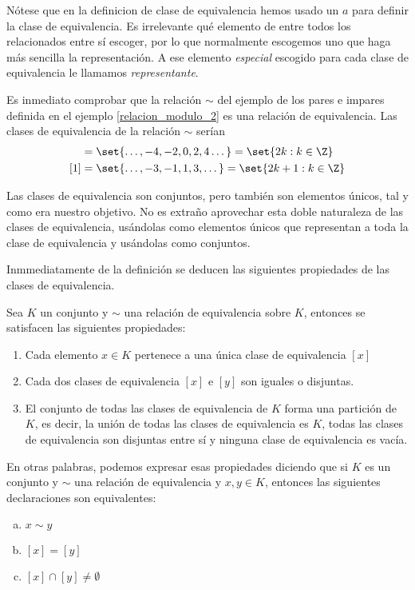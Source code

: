 \documentclass[../algebra_lineal.tex]{subfiles}
\begin{document}
\begin{remark}
    Nótese que en la definicion de clase de equivalencia hemos usado un $a$ para definir la clase de equivalencia. Es irrelevante qué elemento de entre todos los relacionados entre sí escoger, por lo que normalmente escogemos uno que haga más sencilla la representación. A ese elemento \textit{especial} escogido para cada clase de equivalencia le llamamos \textit{representante}.
\end{remark}

\begin{example}
    Es inmediato comprobar que la relación $\sim$ del ejemplo de los pares e impares definida en el ejemplo \ref{relacion_modulo_2} es una relación de equivalencia. Las clases de equivalencia de la relación $\sim$ serían
    \begin{align*}
        [0] &= \set{\dots, -4, -2, 0, 2, 4 \dots} = \set{2k : k \in \Z} \\
        [1] &= \set{\dots, -3, -1, 1, 3, \dots} = \set{2k+1 : k \in \Z}
    \end{align*}  
\end{example}

Las clases de equivalencia son conjuntos, pero también son elementos únicos, tal y como era nuestro objetivo. No es extraño aprovechar esta doble naturaleza de las clases de equivalencia, usándolas como elementos únicos que representan a toda la clase de equivalencia y usándolas como conjuntos.

Inmmediatamente de la definición se deducen las siguientes propiedades de las clases de equivalencia.

\begin{corollary}
    \label{propiedades_relacion_equivalencia}
    Sea $K$ un conjunto y $\sim$ una relación de equivalencia sobre $K$, entonces se satisfacen las siguientes propiedades:
    \begin{enumerate}
        \item Cada elemento $x \in K$ pertenece a una única clase de equivalencia $[x]$
        \item Cada dos clases de equivalencia $[x]$ e $[y]$ son iguales o disjuntas.
        \item El conjunto de todas las clases de equivalencia de $K$ forma una partición de $K$, es decir, la unión de todas las clases de equivalencia es $K$, todas las clases de equivalencia son disjuntas entre sí y ninguna clase de equivalencia es vacía.  
    \end{enumerate}
    En otras palabras, podemos expresar esas propiedades diciendo que si $K$ es un conjunto y $\sim$ una relación de equivalencia y $x, y \in K$, entonces las siguientes declaraciones son equivalentes:
    \begin{enumerate}[a)]
        \item $x \sim y$
        \item $[x] = [y]$
        \item $[x] \cap [y] \ne \emptyset$
    \end{enumerate}
\end{corollary}
\end{document}
